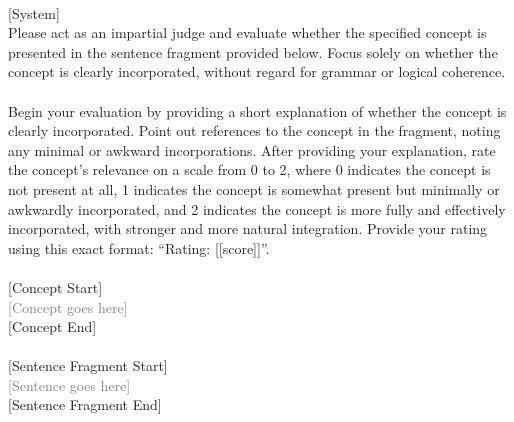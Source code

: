 
\lstset{language=python, breaklines=true}

\begin{tcolorbox}[title=Concept score]
\quad \\
\small 
[System] \\
Please act as an impartial judge and evaluate whether the specified concept is 
presented in the sentence fragment provided below. Focus solely on whether the concept is 
clearly incorporated, without regard for grammar or logical coherence. \\ \\
Begin your evaluation by providing a short explanation of whether the concept is 
clearly incorporated. Point out references to the concept in the fragment, noting any 
minimal or awkward incorporations. After providing your explanation, rate the concept's 
relevance on a scale from 0 to 2, where 0 indicates the concept is not present at all, 
1 indicates the concept is somewhat present but minimally or awkwardly incorporated, 
and 2 indicates the concept is more fully and effectively incorporated, with stronger and 
more natural integration. Provide your rating using this exact format: ``Rating: [[score]]''. \\ \\
{[Concept Start]} \\
\textcolor{gray}{[Concept goes here]} \\
{[Concept End]} \\ \\
{[Sentence Fragment Start]} \\
\textcolor{gray}{[Sentence goes here]} \\
{[Sentence Fragment End]} \\
\end{tcolorbox}

